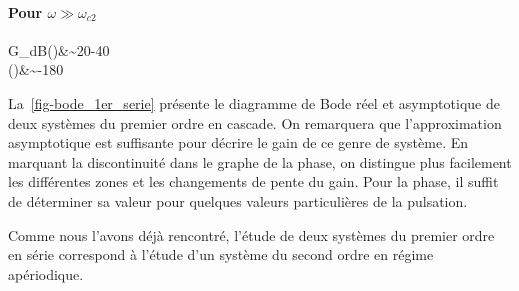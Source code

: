\paragraph{Pour $\omega\gg\omega_{c2}$}
\begin{bequation}
    G_{dB}(\omega)&\sim20-40\\
    \phi(\omega)&\sim-180\degree
\end{bequation}

La~\cref{fig-bode_1er_serie} présente le diagramme de Bode réel et asymptotique 
de deux systèmes du premier ordre en cascade. On remarquera que l'approximation asymptotique est suffisante 
pour décrire le gain de ce genre de système. En marquant la discontinuité dans le graphe de la phase, 
on distingue plus facilement les différentes zones et les changements de pente du gain. Pour la phase, il suffit de déterminer
sa valeur pour quelques valeurs particulières de la pulsation. 

Comme nous l'avons déjà rencontré, l'étude de deux systèmes du premier ordre en série correspond à l'étude d'un système
du second ordre en régime apériodique.

